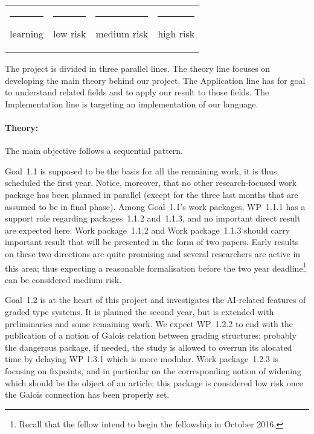 \documentclass{article}[11pt]
\begin{document}
\begin{tabular}{c c c c}
{\color{cyan!20}\rule{13pt}{13pt}}  learning &
{\color{green!20}\rule{13pt}{13pt}}  low risk &
{\color{yellow!30}\rule{13pt}{13pt}}  medium risk &
{\color{red!20}\rule{13pt}{13pt}}  high risk
\end{tabular}

\medskip

The project is divided in three parallel lines. The theory line focuses on developing the main theory behind our project. The Application line has for goal to understand related fields and to apply our result to those fields. The Implementation line is targeting an implementation of our language.

\paragraph{Theory:}
The main objective follows a sequential pattern.

Goal~1.1 is supposed to be the basis for all the remaining work, it is thus scheduled the first year. Notice, moreover, that no other research-focused work package has been planned in parallel (except for the three last months that are assumed to be in final phase). %
Among Goal~1.1's work packages, WP~1.1.1 has a support role regarding packages~1.1.2 and~1.1.3, and no important direct result are expected here. Work package~1.1.2 and Work package~1.1.3 should carry important result that will be presented in the form of two papers. Early results on these two directions are quite promising and several researchers are active in this area; thus expecting a reasonable formalisation before the two year deadline\footnote{Recall that the fellow intend to begin the fellowship in October 2016.} can be considered medium risk. 

Goal~1.2 is at the heart of this project and investigates the AI-related features of graded type systems. It is planned the second year, but is extended with preliminaries and some remaining work. We expect WP~1.2.2 to end with the publication of a notion of Galois relation between grading structures; probably the dangerous package, if needed, the study is allowed to overrun its alocated time by delaying WP 1.3.1 which is more modular. Work package~1.2.3 is focusing on fixpoints, and in particular on the corresponding notion of widening which should be the object of an article; this package is considered low risk once the Galois connection has been properly set.
\end{document}
